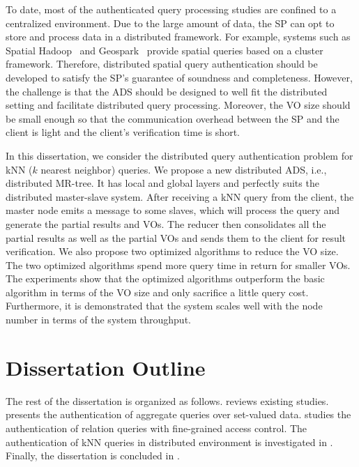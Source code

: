 To date, most of the authenticated query processing studies are confined to a centralized environment. Due to the large amount of data, the SP can opt to store and process data in a distributed framework. For example, systems such as Spatial Hadoop~\cite{10.1109/icde.2015.7113382} and Geospark~\cite{10.1145/2820783.2820860} provide spatial queries based on a cluster framework. Therefore, distributed spatial query authentication should be developed to satisfy the SP's guarantee of soundness and completeness. However, the challenge is that the ADS should be designed to well fit the distributed setting and facilitate distributed query processing. Moreover, the VO size should be small enough so that the communication overhead between the SP and the client is light and the client's verification time is short.

In this dissertation, we consider the distributed query authentication problem for kNN ($k$ nearest neighbor) queries. We propose a new distributed ADS, i.e., distributed MR-tree. It has local and global layers and  perfectly suits the distributed master-slave system. After receiving a kNN query from the client, the master node emits a message to some slaves, which will process the query and generate the partial results and VOs. The reducer then consolidates all the partial results as well as the partial VOs and sends them to the client for result verification. We also propose two optimized algorithms to reduce the VO size. The two optimized algorithms spend more query time in return for smaller VOs. The experiments show that the optimized algorithms outperform the basic algorithm in terms of the VO size and only sacrifice a little query cost. Furthermore, it is demonstrated that the system scales well with the node number in terms of the system throughput.

\section{Dissertation Outline}

The rest of the dissertation is organized as follows.  reviews existing studies.  presents the authentication of aggregate queries over set-valued data.  studies the authentication of relation queries with fine-grained access control. The authentication of {kNN} queries in distributed environment is investigated in . Finally, the dissertation is concluded in .
